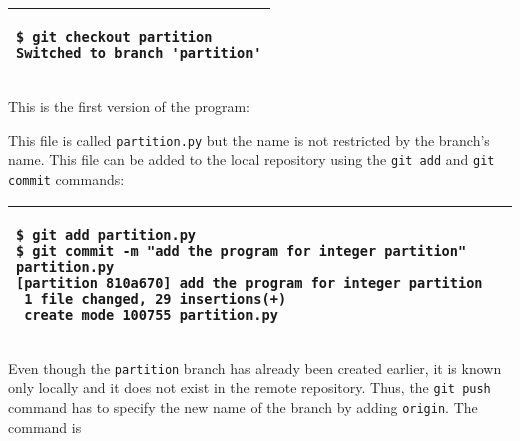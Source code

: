 \vspace{0.2in}
\noindent
\begin{tabular}{|p{5in}|}\hline
\begin{verbatim}
$ git checkout partition
Switched to branch 'partition'
\end{verbatim}
\\ \hline
\end{tabular}
\vspace{0.2in}

The {\tt git branch} command shows two branches and
the current working branch is called {\tt partition}.

\vspace{0.2in}
\noindent
\begin{tabular}{|p{5in}|}\hline
\begin{verbatim}
$ git branch
  master
* partition
\end{verbatim}
\\ \hline
\end{tabular}
\vspace{0.2in}


This is the first version of the program:

\resetlinenumber[1]
\linenumbers
\begin{tt}
  
\end{tt}
\nolinenumbers

This file is called {\tt partition.py} but the name is not restricted
by the branch's name.  This file can be added to the local repository
using the {\tt git add} and {\tt git commit} commands:

\vspace{0.2in}
\noindent
\begin{tabular}{|p{5in}|}\hline
\begin{verbatim}
$ git add partition.py 
$ git commit -m "add the program for integer partition" partition.py 
[partition 810a670] add the program for integer partition
 1 file changed, 29 insertions(+)
 create mode 100755 partition.py
\end{verbatim}
\\ \hline
\end{tabular}
\vspace{0.2in}

Even though the {\tt partition} branch has already been created earlier,
it is known only locally and it  does not exist in the remote repository.
Thus, the {\tt git push} command has to specify the new name of the branch
by adding {\tt origin}.
The command is


